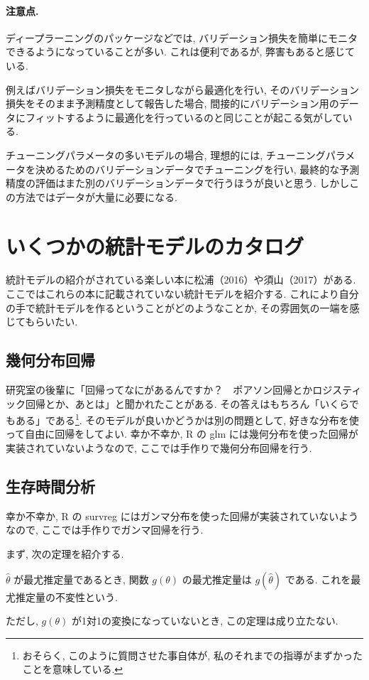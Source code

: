 \documentclass[a4paper, 12pt]{jarticle}
\begin{document}
\paragraph{注意点.}
ディープラーニングのパッケージなどでは, バリデーション損失を簡単にモニタできるようになっていることが多い. これは便利であるが, 弊害もあると感じている.

例えばバリデーション損失をモニタしながら最適化を行い, そのバリデーション損失をそのまま予測精度として報告した場合, 間接的にバリデーション用のデータにフィットするように最適化を行っているのと同じことが起こる気がしている. 

チューニングパラメータの多いモデルの場合, 理想的には, チューニングパラメータを決めるためのバリデーションデータでチューニングを行い, 最終的な予測精度の評価はまた別のバリデーションデータで行うほうが良いと思う. しかしこの方法ではデータが大量に必要になる. 


\section{いくつかの統計モデルのカタログ}
\label{secCata}

統計モデルの紹介がされている楽しい本に松浦（2016）や須山（2017）がある.
ここではこれらの本に記載されていない統計モデルを紹介する. これにより自分の手で統計モデルを作るということがどのようなことか, その雰囲気の一端を感じてもらいたい. 

\subsection{幾何分布回帰}

研究室の後輩に「回帰ってなにがあるんですか？　ポアソン回帰とかロジスティック回帰とか、あとは」と聞かれたことがある. 
その答えはもちろん「いくらでもある」である\footnote{おそらく, このように質問させた事自体が, 私のそれまでの指導がまずかったことを意味している.}. そのモデルが良いかどうかは別の問題として, 好きな分布を使って自由に回帰をしてよい. 
幸か不幸か, R の glm には幾何分布を使った回帰が実装されていないようなので, ここでは手作りで幾何分布回帰を行う. 

\subsection{生存時間分析}
幸か不幸か, R の survreg にはガンマ分布を使った回帰が実装されていないようなので, ここでは手作りでガンマ回帰を行う. 

まず, 次の定理を紹介する. 

\begin{theorem}
$\hat \theta$ が最尤推定量であるとき, 関数 $g(\theta)$ の最尤推定量は $g(\hat \theta)$ である. これを最尤推定量の不変性という.
\end{theorem}
ただし, $g(\theta)$ が1対1の変換になっていないとき, この定理は成り立たない. 
\end{document}

